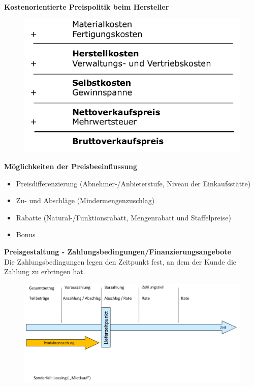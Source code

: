 \documentclass[a4paper,11pt, twoside]{article}
\begin{document}
\textbf{Kostenorientierte Preispolitik beim Hersteller}
\begin{figure}[h]
 \begin{center}
   \includegraphics[scale=0.3]{bilder/kostenorientierte_preispolitik2.png}
 \end{center}
\end{figure}

\textbf{Möglichkeiten der Preisbeeinflussung}
\begin{itemize}
	\item Preisdifferenzierung (Abnehmer-/Anbieterstufe, Niveau der Einkaufsstätte)
	\item Zu- und Abschläge (Mindermengenzuschlag)
	\item Rabatte (Natural-/Funktionsrabatt, Mengenrabatt und Staffelpreise)
	\item Bonus
\end{itemize}

\textbf{Preisgestaltung - Zahlungsbedingungen/Finanzierungsangebote}\\
Die Zahlungsbedingungen legen den Zeitpunkt fest, an dem der Kunde die Zahlung zu erbringen hat.
\begin{figure}[h]
 \begin{center}
   \includegraphics[scale=0.3]{bilder/preisgestaltung.png}
 \end{center}
\end{figure}
\end{document}
